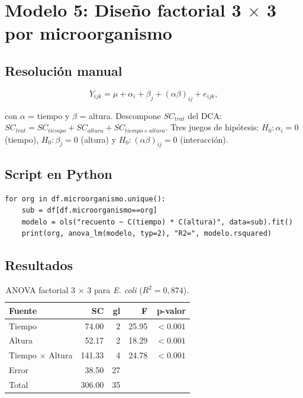 \documentclass[12pt,a4paper]{article}
\begin{document}
\section{Modelo 5: Diseño factorial 3 \texorpdfstring{$\times$}{x} 3 por microorganismo}

\subsection{Resolución manual}

\[
Y_{ijk} = \mu + \alpha_i + \beta_j + (\alpha\beta)_{ij} + e_{ijk},
\]

con $\alpha$ = tiempo y $\beta$ = altura. Descompone $SC_{trat}$ del DCA:
$SC_{trat}=SC_{tiempo}+SC_{altura}+SC_{tiempo\times altura}$. Tres juegos de hipótesis: $H_0:\alpha_i=0$ (tiempo), $H_0:\beta_j=0$ (altura) y $H_0:(\alpha\beta)_{ij}=0$ (interacción).

\subsection{Script en Python}

\begin{lstlisting}[caption={ANOVA factorial 3x3 por microorganismo.}]
for org in df.microorganismo.unique():
    sub = df[df.microorganismo==org]
    modelo = ols("recuento ~ C(tiempo) * C(altura)", data=sub).fit()
    print(org, anova_lm(modelo, typ=2), "R2=", modelo.rsquared)
\end{lstlisting}

\subsection{Resultados}

\begin{table}[H]
\centering
\caption{ANOVA factorial 3 $\times$ 3 para \textit{E. coli} ($R^2=0{,}874$).}
\begin{tabular}{lrrrr}
\toprule
\textbf{Fuente} & \textbf{SC} & \textbf{gl} & \textbf{F} & \textbf{p-valor}\\
\midrule
Tiempo & 74.00 & 2 & 25.95 & $<0.001$\\
Altura & 52.17 & 2 & 18.29 & $<0.001$\\
Tiempo $\times$ Altura & 141.33 & 4 & 24.78 & $<0.001$\\
Error & 38.50 & 27 & &\\
Total & 306.00 & 35 & &\\
\bottomrule
\end{tabular}
\end{table}
\end{document}
